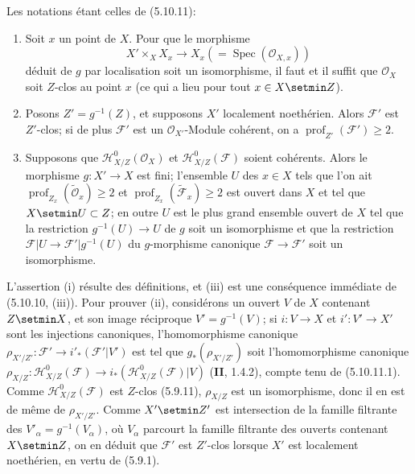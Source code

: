 \begin{proposition}[5.10.12]
\label{IV.2.s5.10.12-fr}
Les notations étant celles de \textup{(5.10.11)}:
\begin{enumerate}
\item[\textup{(i)}] Soit $x$ un point de $X$. Pour que le morphisme
\[
X'\times_X X_x\longrightarrow X_x(=\operatorname{Spec}(\mathcal O_{X,x}))
\]
déduit de $g$ par localisation soit un isomorphisme, il faut et il suffit que
$\mathcal O_X$ soit $Z$-clos au point $x$ (ce qui a lieu pour tout $x\in X\setmin Z$).
\item[\textup{(ii)}] Posons $Z'=g^{-1}(Z)$, et supposons $X'$ localement noethérien.
Alors $\mathcal F'$ est $Z'$-clos; si de plus $\mathcal F'$ est un
$\mathcal O_{X'}$-Module cohérent, on a
$\operatorname{prof}_{Z'}(\mathcal F')\geq2$.
\item[\textup{(iii)}] Supposons que $\mathcal H^0_{X/Z}(\mathcal O_X)$ et
$\mathcal H^0_{X/Z}(\mathcal F)$ soient cohérents. Alors le morphisme
$g:X'\to X$ est fini; l'ensemble $U$ des $x\in X$ tels que l'on ait
$\operatorname{prof}_{Z_x}(\widetilde{\mathcal O}_x)\geq2$ et
$\operatorname{prof}_{Z_x}(\widetilde{\mathcal F}_x)\geq2$ est ouvert dans
$X$ et tel que $X\setmin U\subset Z$; en outre $U$ est le plus grand ensemble ouvert
de $X$ tel que la restriction $g^{-1}(U)\to U$ de $g$ soit un isomorphisme et
que la restriction $\mathcal F|U\to\mathcal F'|g^{-1}(U)$ du $g$-morphisme
canonique $\mathcal F\to\mathcal F'$ soit un isomorphisme.
\end{enumerate}
\end{proposition}

L'assertion (i) résulte des définitions, et (iii) est une conséquence immédiate
de (5.10.10, (iii)). Pour prouver (ii), considérons un ouvert $V$ de $X$
contenant $Z\setmin X$, et son image réciproque $V'=g^{-1}(V)$; si $i:V\to X$ et
$i':V'\to X'$ sont les injections
canoniques, l'homomorphisme canonique
$\rho_{X'/Z'}:\mathcal F'\to i'_*(\mathcal F'|V')$ est tel que
$g_*(\rho_{X'/Z'})$ soit l'homomorphisme canonique
$\rho_{X/Z}:\mathcal H^0_{X/Z}(\mathcal F)
\to i_*(\mathcal H^0_{X/Z}(\mathcal F)|V)$
(\textbf{II}, 1.4.2), compte tenu de (5.10.11.1). Comme
$\mathcal H^0_{X/Z}(\mathcal F)$ est $Z$-clos (5.9.11), $\rho_{X/Z}$ est un
isomorphisme, donc il en est de même de $\rho_{X'/Z'}$. Comme $X'\setmin Z'$ est
intersection de la famille filtrante des $V'_\alpha=g^{-1}(V_\alpha)$, où
$V_\alpha$ parcourt la famille filtrante des ouverts contenant $X\setmin Z$, on en
déduit que $\mathcal F'$ est $Z'$-clos lorsque $X'$ est localement noethérien,
en vertu de (5.9.1).

